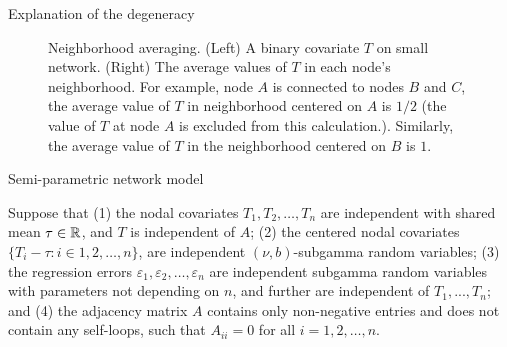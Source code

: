\documentclass[final]{beamer}
\newlength{\colwidth}
\begin{document}
\begin{frame}[t]
\begin{columns}[t]
\begin{column}{\colwidth}
\begin{block}{Explanation of the degeneracy}
\begin{figure}
\begin{minipage}{0.49\textwidth}
                    \end{minipage}
                    \caption{Neighborhood averaging. (Left) A binary covariate $T$ on small network. (Right) The  average values of $T$ in each node's neighborhood. For example, node $A$ is connected to nodes $B$ and $C$, the average value of $T$ in neighborhood centered on $A$ is $1/2$ (the value of $T$ at node $A$ is excluded from this calculation.). Similarly, the average value of $T$ in the neighborhood centered on $B$ is $1$.}
                    \label{fig:averaging}
                \end{figure}
            \end{block}

            \begin{block}{Semi-parametric network model}


                \begin{lemma} \label{lem:indepcov:nonid}
                    Suppose that (1) the nodal covariates $T_1,T_2,\dots,T_n$ are independent with shared mean $\tau \in \mathbb{R}$, and $T$ is independent of $A$; (2) the centered nodal covariates $\{ T_i - \tau : i \in 1,2,\dots, n \}$, are independent $(\nu,b)$-subgamma random variables; (3) the regression errors $\varepsilon_1, \varepsilon_2, \dots, \varepsilon_n$ are independent subgamma random variables with parameters not depending on $n$, and further are independent of $T_1, ..., T_n$; and (4) the adjacency matrix $A$ contains only non-negative entries and does not contain any self-loops, such that $A_{ii} = 0$ for all $i = 1,2,\dots, n$.


\end{lemma}
\end{block}
\end{column}
\end{columns}
\end{frame}
\end{document}
